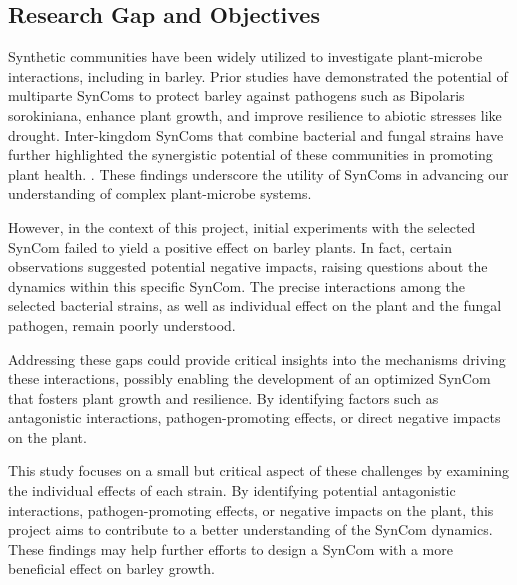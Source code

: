 \subsection{Research Gap and Objectives}
Synthetic communities have been widely utilized to investigate plant-microbe interactions, including in barley. Prior studies have demonstrated the potential of multiparte SynComs to protect barley against pathogens such as Bipolaris sorokiniana, enhance plant growth, and improve resilience to abiotic stresses like drought. Inter-kingdom SynComs that combine bacterial and fungal strains have further highlighted the synergistic potential of these communities in promoting plant health. \cite{mahdi2022Fungal}. These findings underscore the utility of SynComs in advancing our understanding of complex plant-microbe systems.

However, in the context of this project, initial experiments with the selected SynCom failed to yield a positive effect on barley plants. In fact, certain observations suggested potential negative impacts, raising questions about the dynamics within this specific SynCom. The precise interactions among the selected bacterial strains, as well as individual effect on the plant and the fungal pathogen, remain poorly understood.

Addressing these gaps could provide critical insights into the mechanisms driving these interactions, possibly enabling the development of an optimized SynCom that fosters plant growth and resilience. By identifying factors such as antagonistic interactions, pathogen-promoting effects, or direct negative impacts on the plant.

This study focuses on a small but critical aspect of these challenges by examining the individual effects of each strain. By identifying potential antagonistic interactions, pathogen-promoting effects, or negative impacts on the plant, this project aims to contribute to a better understanding of the SynCom dynamics. These findings may help further efforts to design a \ac{SynCom} with a more beneficial effect on barley growth.

